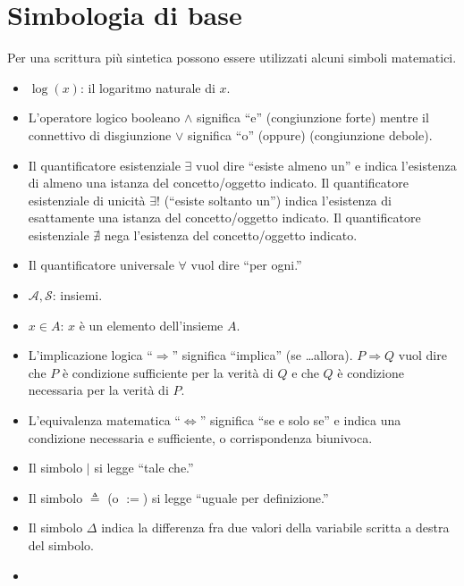 \documentclass[
  11pt,
]{krantz}
\providecommand{\tightlist}{%
  \setlength{\itemsep}{0pt}\setlength{\parskip}{0pt}}
\theoremstyle{definition}
\theoremstyle{definition}
\theoremstyle{definition}
\theoremstyle{definition}
\theoremstyle{remark}
\begin{document}
\mainmatter

\hypertarget{appendix-appendix}{%
\appendix {}}


\hypertarget{simbologia-di-base}{%
\chapter{Simbologia di base}\label{simbologia-di-base}}

Per una scrittura più sintetica possono essere utilizzati alcuni simboli matematici.

\begin{itemize}
\tightlist
\item
  \(\log(x)\): il logaritmo naturale di \(x\).
\item
  L'operatore logico booleano \(\land\) significa ``e'' (congiunzione forte) mentre il connettivo di disgiunzione \(\lor\) significa ``o'' (oppure) (congiunzione debole).
\item
  Il quantificatore esistenziale \(\exists\) vuol dire ``esiste almeno un'' e indica l'esistenza di almeno una istanza del concetto/oggetto indicato. Il quantificatore esistenziale di unicità \(\exists!\) (``esiste soltanto un'') indica l'esistenza di esattamente una istanza del concetto/oggetto indicato. Il quantificatore esistenziale \(\nexists\) nega l'esistenza del concetto/oggetto indicato.
\item
  Il quantificatore universale \(\forall\) vuol dire ``per ogni.''
\item
  \(\mathcal{A, S}\): insiemi.
\item
  \(x \in A\): \(x\) è un elemento dell'insieme \(A\).
\item
  L'implicazione logica ``\(\Rightarrow\)'' significa ``implica'' (se \ldots allora). \(P \Rightarrow Q\) vuol dire che \(P\) è condizione sufficiente per la verità di \(Q\) e che \(Q\) è condizione necessaria per la verità di \(P\).
\item
  L'equivalenza matematica ``\(\iff\)'' significa ``se e solo se'' e indica una condizione necessaria e sufficiente, o corrispondenza biunivoca.
\item
  Il simbolo \(\vert\) si legge ``tale che.''
\item
  Il simbolo \(\triangleq\) (o \(:=\)) si legge ``uguale per definizione.''
\item
  Il simbolo \(\Delta\) indica la differenza fra due valori della variabile scritta a destra del simbolo.
\item

\end{itemize}
\end{document}
